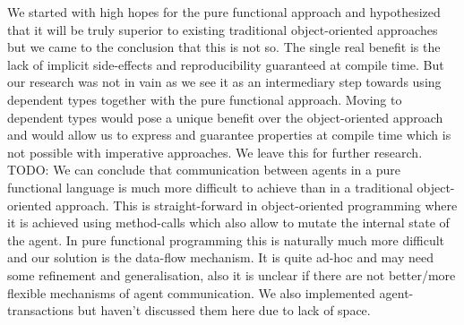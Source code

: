 We started with high hopes for the pure functional approach and hypothesized that it will be truly superior to existing traditional object-oriented approaches but we came to the conclusion that this is not so. The single real benefit is the lack of implicit side-effects and reproducibility guaranteed at compile time. But our research was not in vain as we see it as an intermediary step towards using dependent types together with the pure functional approach. Moving to dependent types would pose a unique benefit over the object-oriented approach and would allow us to express and guarantee properties at compile time which is not possible with imperative approaches. We leave this for further research.
TODO: We can conclude that communication between agents in a pure functional language is much more difficult to achieve than in a traditional object-oriented approach. This is straight-forward in object-oriented programming where it is achieved using method-calls which also allow to mutate the internal state of the agent. In pure functional programming this is naturally much more difficult and our solution is the data-flow mechanism. It is quite ad-hoc and may need some refinement and generalisation, also it is unclear if there are not better/more flexible mechanisms of agent communication. We also implemented agent-transactions but haven't discussed them here due to lack of space. 

